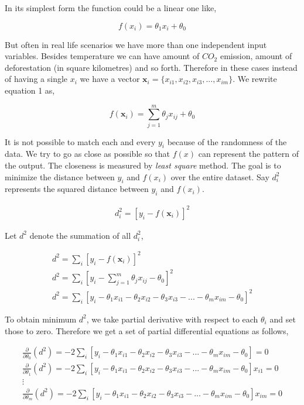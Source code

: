 \documentclass[english]{tktltiki}
\begin{document}
In its simplest form the function could be a linear one like,

\begin{equation}
f(x_i) = \theta_1 x_i + \theta_0
\end{equation}


But often in real life scenarios we have more than one independent input variables. Besides temperature we can have amount of $CO_2$ emission, amount of deforestation (in square kilometres) and so forth. Therefore in these cases instead of having a single $x_i$ we have a vector $\mathbf{x}_i = \{x_{i1}, x_{i2}, x_{i3}, ..., x_{im}\}$. We rewrite equation 1 as,

\begin{equation}
f(\mathbf{x}_i) = \sum_{j=1}^m \theta_j x_{ij} + \theta_0
\end{equation}

It is not possible to match each and every $y_i$ because of the randomness of the data. We try to go as close as possible so that $f(x)$ can represent the pattern of the output. The closeness is measured by \textit{least square} method. The goal is to minimize the distance between $y_i$ and $f(x_i)$ over the entire dataset. Say $d^2_i$ represents the squared distance between $y_i$ and $f(x_i)$.

\begin{eqnarray}
d^2_i = [y_i - f(\mathbf{x}_i)]^2
\end{eqnarray}

Let $d^2$ denote the summation of all $d^2_i$,

\begin{eqnarray}
d^2 = \sum_i[y_i - f(\mathbf{x}_i)]^2 \nonumber\\
d^2 = \sum_i[y_i - \sum_{j=1}^m \theta_j x_{ij} - \theta_0]^2 \nonumber\\
d^2 = \sum_i[y_i - \theta_1x_{i1} - \theta_2x_{i2} - \theta_3x_{i3} - ... - \theta_mx_{im} - \theta_0]^2
\end{eqnarray}

To obtain minimum $d^2$, we take partial derivative with respect to each $\theta_i$ and set those to zero. Therefore we get a set of partial differential equations as follows,

\begin{eqnarray}
\frac{\partial}{\partial{\theta_0}}(d^2) = -2\sum_i[y_i - \theta_1x_{i1} - \theta_2x_{i2} - \theta_3x_{i3} - ... - \theta_mx_{im} - \theta_0] = 0\nonumber \\
\frac{\partial}{\partial{\theta_1}}(d^2) = -2\sum_i[y_i - \theta_1x_{i1} - \theta_2x_{i2} - \theta_3x_{i3} - ... - \theta_mx_{im} - \theta_0]x_{i1} = 0\nonumber \\
\vdots \nonumber \\
\frac{\partial}{\partial{\theta_m}}(d^2) = -2\sum_i[y_i - \theta_1x_{i1} - \theta_2x_{i2} - \theta_3x_{i3} - ... - \theta_mx_{im} - \theta_0]x_{im} = 0
\end{eqnarray}
\end{document}
